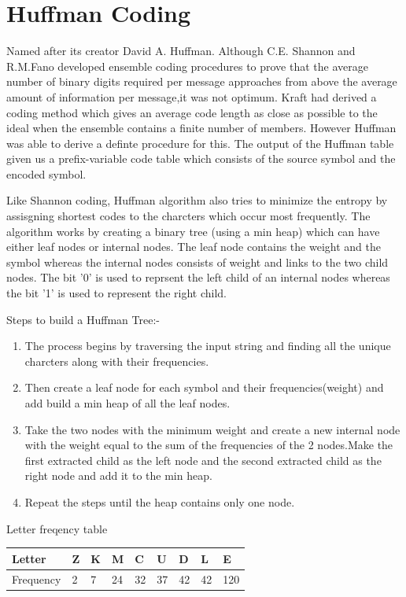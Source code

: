 \documentclass{article}
\begin{document}
 
\section {Huffman Coding}
Named after its creator David A. Huffman. Although C.E. Shannon \cite{shannon1948mathematical} and R.M.Fano \cite{fano1949transmission} developed ensemble coding procedures to prove that the average number of binary digits required per message approaches from above the average amount of information per message,it was not optimum. Kraft \cite{kraft1949device} had derived a coding method which gives an average code length as close as possible to the ideal when the ensemble contains a finite number of members. However Huffman was able to derive a definte procedure for this. The output of the Huffman table given us a prefix-variable code table which consists of the source symbol and the encoded symbol. 

Like Shannon coding, Huffman algorithm also tries to minimize the entropy by assisgning shortest codes to the charcters which occur most frequently. The algorithm works by creating a binary tree (using a min heap) which can have either leaf nodes or internal nodes. The leaf node contains the weight and the symbol whereas the internal nodes consists of weight and links to the two child nodes. The bit '0' is used to reprsent the left child of an internal nodes whereas the bit '1' is used to represent the right child.

Steps to build a Huffman Tree:-

\begin{enumerate}
	\item The process begins by traversing the input string and finding all the unique charcters along with their frequencies.
	\item Then create a leaf node for each symbol and their frequencies(weight) and add build a min heap of all the leaf nodes.
	\item Take the two nodes with the minimum weight and create a new  internal node with the weight equal to the sum of the frequencies of the 2 nodes.Make the first extracted child as the left node and the second extracted child as the right node and add it to the min heap.
	\item Repeat the steps until the heap contains only one node.
\end{enumerate}

Letter freqency table

\begin{flushleft}
	\setlength{\extrarowheight}{0.2cm}
	\begin{tabular}{|l|l|l|l|l|l|l|l|l|}
		\hline
		Letter    & Z	 & K & M  & C  & U  & D  & L  & E   \\ \hline
		Frequency & 2 & 7 & 24 & 32 & 37 & 42 & 42 & 120 \\ \hline
	\end{tabular}
\end{flushleft}
\end{document}
